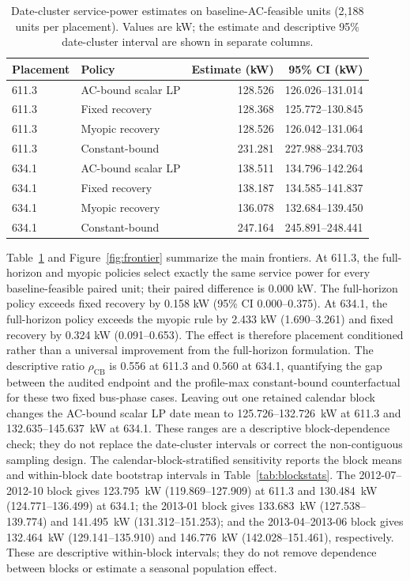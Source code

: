 \documentclass[11pt]{article}
\begin{document}
\begin{table}[t]
\centering
\caption{Date-cluster service-power estimates on baseline-AC-feasible units (2,188 units per placement). Values are kW; the estimate and descriptive 95\% date-cluster interval are shown in separate columns.}
\label{tab:frontier}
\small
\begin{tabular}{llrr}
\toprule
Placement & Policy & Estimate (kW) & 95\% CI (kW)\\
\midrule
611.3 & AC-bound scalar LP & 128.526 & 126.026--131.014\\
611.3 & Fixed recovery & 128.368 & 125.772--130.845\\
611.3 & Myopic recovery & 128.526 & 126.042--131.064\\
611.3 & Constant-bound & 231.281 & 227.988--234.703\\
634.1 & AC-bound scalar LP & 138.511 & 134.796--142.264\\
634.1 & Fixed recovery & 138.187 & 134.585--141.837\\
634.1 & Myopic recovery & 136.078 & 132.684--139.450\\
634.1 & Constant-bound & 247.164 & 245.891--248.441\\
\bottomrule
\end{tabular}
\end{table}

Table~\ref{tab:frontier} and Figure~\ref{fig:frontier} summarize the main frontiers. At 611.3, the full-horizon and myopic policies select exactly the same service power for every baseline-feasible paired unit; their paired difference is 0.000 kW. The full-horizon policy exceeds fixed recovery by 0.158 kW (95\% CI 0.000--0.375). At 634.1, the full-horizon policy exceeds the myopic rule by 2.433 kW (1.690--3.261) and fixed recovery by 0.324 kW (0.091--0.653). The effect is therefore placement conditioned rather than a universal improvement from the full-horizon formulation. The descriptive ratio $\rho_{\mathrm{CB}}$ is 0.556 at 611.3 and 0.560 at 634.1, quantifying the gap between the audited endpoint and the profile-max constant-bound counterfactual for these two fixed bus-phase cases.
Leaving out one retained calendar block changes the AC-bound scalar LP date mean to 125.726--132.726~kW at 611.3 and 132.635--145.637~kW at 634.1. These ranges are a descriptive block-dependence check; they do not replace the date-cluster intervals or correct the non-contiguous sampling design.
The calendar-block-stratified sensitivity reports the block means and within-block date bootstrap intervals in Table~\ref{tab:blockstats}. The 2012-07--2012-10 block gives 123.795~kW (119.869--127.909) at 611.3 and 130.484~kW (124.771--136.499) at 634.1; the 2013-01 block gives 133.683~kW (127.538--139.774) and 141.495~kW (131.312--151.253); and the 2013-04--2013-06 block gives 132.464~kW (129.141--135.910) and 146.776~kW (142.028--151.461), respectively. These are descriptive within-block intervals; they do not remove dependence between blocks or estimate a seasonal population effect.
\end{document}

